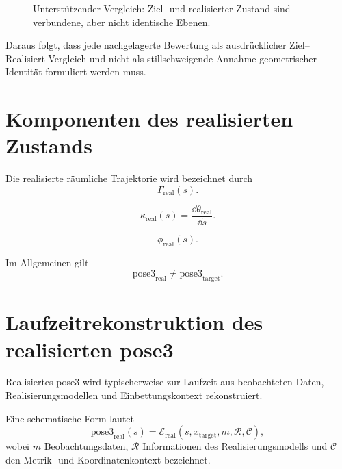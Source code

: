 \begin{figure}[ht]
\centering

\caption{Unterstützender Vergleich: Ziel- und realisierter Zustand sind verbundene, aber nicht identische Ebenen.}
\label{fig:support-target-vs-realized}
\end{figure}

Daraus folgt, dass jede nachgelagerte Bewertung als ausdrücklicher
Ziel--Realisiert-Vergleich und nicht als stillschweigende Annahme geometrischer
Identität formuliert werden muss.

\section{Komponenten des realisierten Zustands}

\begin{definition}
\label{def:realized-spatial-trajectory}
Die realisierte räumliche Trajektorie wird bezeichnet durch
\[
\Gamma_{\mathrm{real}}(s).
\]
\end{definition}

\begin{definition}
\label{def:realized-pose3-curvature}
\[
\kappa_{\mathrm{real}}(s)=\frac{\dd\theta_{\mathrm{real}}}{\dd s}.
\]
\end{definition}

\begin{definition}
\label{def:realized-cant}
\[
\phi_{\mathrm{real}}(s).
\]
\end{definition}

Im Allgemeinen gilt
\[
\mathrm{pose3}_{\mathrm{real}}
\neq
\mathrm{pose3}_{\mathrm{target}}.
\]

\section{Laufzeitrekonstruktion des realisierten pose3}

Realisiertes pose3 wird typischerweise zur Laufzeit aus beobachteten Daten,
Realisierungsmodellen und Einbettungskontext rekonstruiert.

\begin{definition}
\label{def:runtime-realization-reconstruction}
Eine schematische Form lautet
\[
\mathrm{pose3}_{\mathrm{real}}(s)
=
\mathcal E_{\mathrm{real}}(s,x_{\mathrm{target}},m,\mathcal R,\mathcal C),
\]
wobei \(m\) Beobachtungsdaten, \(\mathcal R\) Informationen des
Realisierungsmodells und \(\mathcal C\) den Metrik- und Koordinatenkontext
bezeichnet.
\end{definition}

